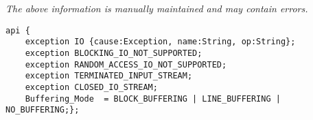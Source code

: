 \label{api:Io\_Exceptions}

{\tiny \it The above information is manually maintained and may contain errors.}
\begin{verbatim}
api {
    exception IO {cause:Exception, name:String, op:String};
    exception BLOCKING_IO_NOT_SUPPORTED;
    exception RANDOM_ACCESS_IO_NOT_SUPPORTED;
    exception TERMINATED_INPUT_STREAM;
    exception CLOSED_IO_STREAM;
    Buffering_Mode  = BLOCK_BUFFERING | LINE_BUFFERING | NO_BUFFERING;};
\end{verbatim}
